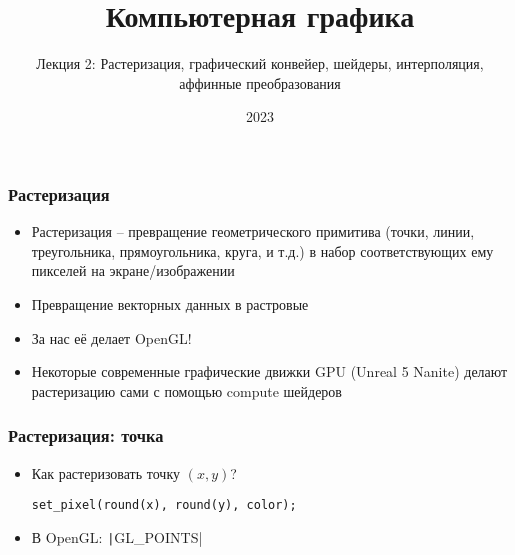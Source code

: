 \documentclass[10pt]{beamer}
\title{Компьютерная графика}
\subtitle{Лекция 2: Растеризация, графический конвейер, шейдеры, интерполяция, аффинные преобразования}
\date{2023}
\begin{document}
\frame{\titlepage}


\begin{frame}
\frametitle{Растеризация}
\begin{itemize}
\item Растеризация -- превращение геометрического примитива (точки, линии, треугольника, прямоугольника, круга, и т.д.) в набор соответствующих ему пикселей на экране/изображении
\item Превращение векторных данных в растровые
\pause
\item За нас её делает OpenGL!
\pause
\item Некоторые современные графические движки GPU (Unreal 5 Nanite) делают растеризацию сами с помощью compute шейдеров
\end{itemize}
\end{frame}

\begin{frame}[fragile]
\frametitle{Растеризация: точка}
\begin{itemize}
\item Как растеризовать точку \begin{math}(x, y)\end{math}?
\pause
{}
\begin{verbatim}
set_pixel(round(x), round(y), color);
\end{verbatim}
\pause
{}
\item В OpenGL: \texttt|GL_POINTS|
\end{itemize}
\end{frame}
\end{document}
